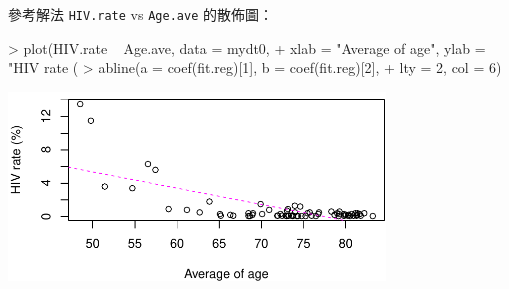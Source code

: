\documentclass[14pt, aspectratio=43]{beamer}
\begin{document}
\begin{frame}{參考解法}
\verb+HIV.rate+ vs \verb+Age.ave+ 的散佈圖：
\begin{RC}
> plot(HIV.rate ~ Age.ave, data = mydt0,
+      xlab = "Average of age", ylab = "HIV rate (%
> abline(a = coef(fit.reg)[1], b = coef(fit.reg)[2],
+        lty = 2, col = 6)
\end{RC}
\begin{center}\includegraphics[width=0.75\textwidth]{Rplot-test-lm.pdf}\end{center}

\end{frame}
\end{document}
